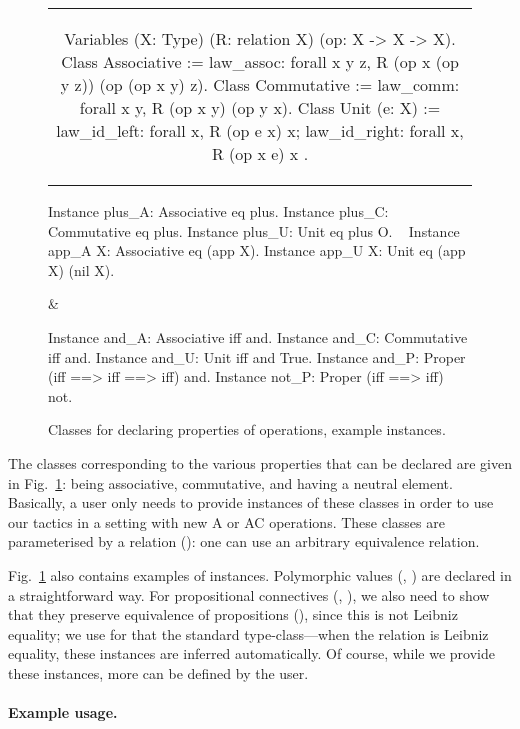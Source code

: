 \documentclass{llncs}
\begin{document}
\begin{figure}[t]
\begin{tabular}{c}\begin{coq}
Variables (X: Type) (R: relation X) (op: X -> X -> X).
Class Associative := law_assoc: forall x y z, R (op x (op y z)) (op (op x y) z).
Class Commutative := law_comm: forall x y, R (op x y) (op y x).
Class Unit (e: X) := { law_id_left: forall x, R (op e x) x; law_id_right: forall x, R (op x e) x }.  
\end{coq}\end{tabular}
\smallskip
\begin{twolistings}
\begin{coq}
Instance plus_A: Associative eq plus.
Instance plus_C: Commutative eq plus.
Instance plus_U: Unit eq plus O.
~
Instance app_A X: Associative eq (app X).
Instance app_U X: Unit eq (app X) (nil X).
\end{coq}
&
\begin{coq}
Instance and_A: Associative iff and.
Instance and_C: Commutative iff and.
Instance and_U: Unit iff and True.
Instance and_P: Proper (iff ==> iff ==> iff) and. 
Instance not_P: Proper (iff ==> iff) not. 
~
\end{coq}
\end{twolistings}
\caption{Classes for declaring properties of operations, example instances.}
\label{fig:classes}
\end{figure}

The classes corresponding to the various properties that can be
declared are given in Fig.~\ref{fig:classes}: being associative,
commutative, and having a neutral element.  Basically, a user only
needs to provide instances of these classes in order to use our
tactics in a setting with new A or AC operations.  These classes are
parameterised by a relation (): one can use an arbitrary
equivalence relation.

Fig.~\ref{fig:classes} also contains examples of instances. 
Polymorphic values (, ) are declared in a
straightforward way. For propositional connectives (,
), we also need to show that they preserve equivalence of
propositions (), since this is not Leibniz equality; we use
for that the standard  type-class---when the relation
 is Leibniz equality, these instances are inferred
automatically.
Of course, while we provide these instances, more can be defined by
the user.

\paragraph{Example usage.}
\end{document}
